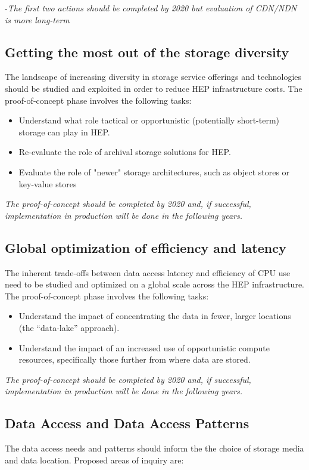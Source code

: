 \documentclass[12pt,a4paper]{article}
\begin{document}
-\emph{The first two actions should be completed by 2020 but evaluation of CDN/NDN is more long-term}

\subsection{Getting the most out of the
storage diversity}\label{storage-diversity}

The landscape of increasing diversity in storage service offerings and technologies should be studied and
exploited in order to reduce HEP infrastructure costs. The proof-of-concept phase involves the following tasks:

\begin{itemize}
\item Understand what role tactical or opportunistic (potentially short-term) storage can play in HEP.
\item Re-evaluate the role of archival storage solutions for HEP.
\item Evaluate the role of "newer" storage architectures, such as object stores or key-value stores
\end{itemize}

\emph{The  proof-of-concept should be completed by 2020 and, if successful, implementation in
production will be done in the following years.}

\subsection{Global optimization of efficiency and latency}\label{efficiency-latency}
The inherent trade-offs between data access latency and efficiency of CPU use need to be studied and optimized
on a global scale across the HEP infrastructure. The proof-of-concept phase involves the following tasks:

\begin{itemize}
\item Understand the impact of concentrating the
  data in fewer, larger locations (the ``data-lake'' approach).
\item Understand the impact of an increased use of
  opportunistic compute resources, specifically those further from where data are stored.
\end{itemize}

\emph{The  proof-of-concept should be completed by 2020 and, if successful, implementation in
production will be done in the following years.}

\subsection{Data Access and Data Access Patterns}\label{access-patterns}
The data access needs and patterns should inform the the choice of storage media and data location. Proposed areas of inquiry are:
\end{document}
